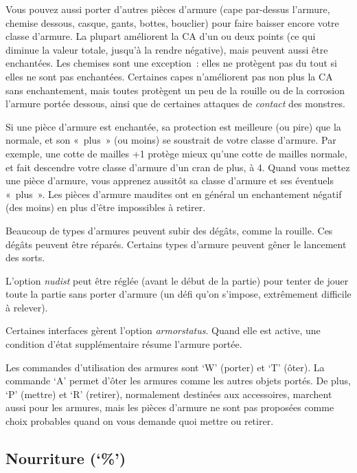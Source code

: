 \documentclass[titlepage]{article}
\begin{document}
Vous pouvez aussi porter d'autres pièces d'armure (cape par-dessus
l'armure, chemise dessous, casque, gants, bottes, bouclier) pour faire
baisser encore votre classe d'armure.
La plupart améliorent la CA d'un ou deux points (ce qui diminue la valeur
totale, jusqu'à la rendre négative), mais peuvent aussi être enchantées.
Les chemises sont une exception~: elles ne protègent pas du tout si elles
ne sont pas enchantées.
Certaines capes n'améliorent pas non plus la CA sans enchantement, mais
toutes protègent un peu de la rouille ou de la corrosion l'armure portée
dessous, ainsi que de certaines attaques de \textit{contact} des monstres.


Si une pièce d'armure est enchantée, sa protection est meilleure (ou pire)
que la normale, et son «~plus~» (ou moins) se soustrait de votre
classe d'armure.
Par exemple, une cotte de mailles +1 protège mieux qu'une cotte de mailles
normale, et fait descendre votre classe d'armure d'un cran de plus, à 4.
Quand vous mettez une pièce d'armure, vous apprenez aussitôt sa classe
d'armure et ses éventuels «~plus~».
Les pièces d'armure maudites ont en général un enchantement négatif (des
moins) en plus d'être impossibles à retirer.


Beaucoup de types d'armures peuvent subir des dégâts, comme la rouille.
Ces dégâts peuvent être réparés.
Certains types d'armure peuvent gêner le lancement des sorts.


L'option
\textit{nudist}
peut être réglée (avant le début de la partie) pour tenter de jouer toute
la partie sans porter d'armure (un défi qu'on s'impose, extrêmement
difficile à relever).


Certaines interfaces gèrent l'option
\textit{armorstatus}.
Quand elle est active, une condition d'état supplémentaire résume l'armure
portée.


Les commandes d'utilisation des armures sont `W' (porter) et
`T' (ôter).
La commande `A' permet d'ôter les armures comme les autres objets
portés.
De plus, `P' (mettre) et `R' (retirer), normalement destinées
aux accessoires, marchent aussi pour les armures, mais les pièces d'armure
ne sont pas proposées comme choix probables quand on vous demande quoi
mettre ou retirer.

\subsection{Nourriture (`\%')}
\end{document}
